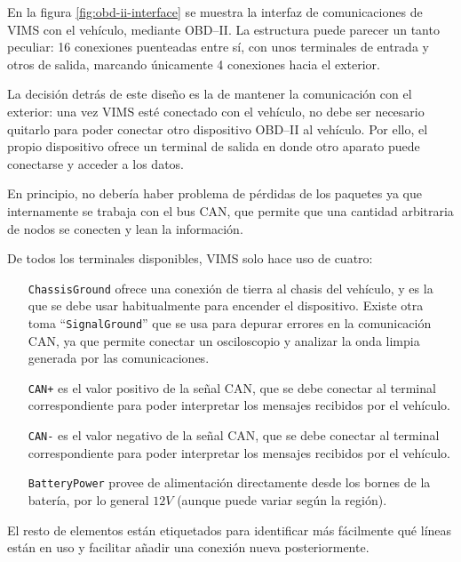 En la figura \ref{fig:obd-ii-interface} se muestra la interfaz de comunicaciones
de \ac{VIMS} con el vehículo, mediante \ac{OBD}--II. La estructura puede parecer
un tanto peculiar: 16 conexiones puenteadas entre sí, con unos terminales de entrada
y otros de salida, marcando únicamente 4 conexiones hacia el exterior.

La decisión detrás de este diseño es la de mantener la comunicación con el exterior:
una vez \ac{VIMS} esté conectado con el vehículo, no debe ser necesario quitarlo para
poder conectar otro dispositivo \ac{OBD}--II al vehículo. Por ello, el propio dispositivo
ofrece un terminal de salida en donde otro aparato puede conectarse y acceder a los datos.

En principio, no debería haber problema de pérdidas de los paquetes ya que internamente
se trabaja con el bus \ac{CAN}, que permite que una cantidad arbitraria de nodos se
conecten y lean la información.

De todos los terminales disponibles, \ac{VIMS} solo hace uso de cuatro:

\begin{enumerate}
  \item[\texttt{ChassisGround}] ofrece una conexión de tierra al chasis del vehículo,
    y es la que se debe usar habitualmente para encender el dispositivo. Existe otra
    toma ``\texttt{SignalGround}'' que se usa para depurar errores en la comunicación
    \ac{CAN}, ya que permite conectar un osciloscopio y analizar la onda limpia generada
    por las comunicaciones.
  \item[\texttt{CAN+}] es el valor positivo de la señal \ac{CAN}, que se debe conectar
    al terminal correspondiente para poder interpretar los mensajes recibidos por
    el vehículo.
  \item[\texttt{CAN-}] es el valor negativo de la señal \ac{CAN}, que se debe conectar
    al terminal correspondiente para poder interpretar los mensajes recibidos por
    el vehículo.
  \item[\texttt{BatteryPower}] provee de alimentación directamente desde los bornes de
    la batería, por lo general $12V$ (aunque puede variar según la región).
\end{enumerate}

El resto de elementos están etiquetados para identificar más fácilmente qué líneas
están en uso y facilitar añadir una conexión nueva posteriormente.

